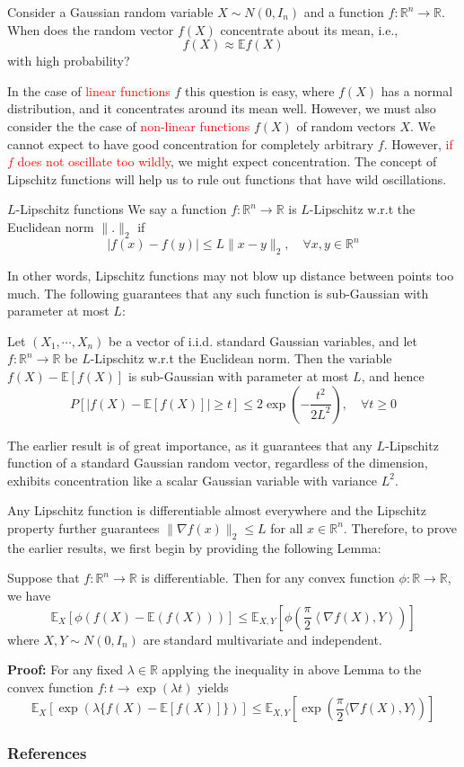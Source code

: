 \documentclass[10pt,handout,english]{beamer}
\newcommand{\E}{\mathbb{E}}
\newcommand{\R}{\mathbb{R}}
\newcommand{\1}{\mathbbm{1}}
\begin{document}
\begin{frame}[allowframebreaks]
Consider a Gaussian random variable $X\sim N(0,I_n)$ and a function $f:\R^n\to\R$. When does the random vector $f(X)$ concentrate about its mean, i.e.,
\[
f(X)\approx \E f(X)
\]
with high probability?

In the case of \textcolor{red}{linear functions} $f$ this question is easy, where $f(X)$ has a normal distribution, and it concentrates around its mean well. However, we must also consider the the case of \textcolor{red}{non-linear functions} $f(X)$ of random vectors $X$. We cannot expect to have good concentration for completely arbitrary $f$. However, \textcolor{red}{if $f$ does not oscillate too wildly}, we might expect concentration. The concept of Lipschitz functions will help us to rule out functions that have wild oscillations.
\begin{block}{$L$-Lipschitz functions}
We say a function $f:\R^n\to\R$ is $L$-Lipschitz w.r.t the Euclidean norm $\lVert.\rVert_2$ if
\[
\lvert f(x)-f(y)\rvert\leq L\lVert x-y\rVert_2,\quad\forall x,y\in\R^n
\]
\end{block}
In other words, Lipschitz functions may not blow up distance between points too much.
The following guarantees that any such function is sub-Gaussian with parameter at most $L$:
\begin{block}{}
Let $(X_1,\cdots,X_n)$ be a vector of i.i.d. standard Gaussian variables, and let $f:\R^n\to\R$ be $L$-Lipschitz w.r.t the Euclidean norm. Then the variable $f(X)-\E[f(X)]$ is sub-Gaussian with parameter at most $L$, and hence
\[
P[\lvert f(X)-\E[f(X)]\rvert\geq t]\leq 2\exp\left(-\frac{t^2}{2L^2}\right),\quad\forall t\geq0
\]
\end{block}

The earlier result is of great importance, as it guarantees that any $L$-Lipschitz function of a standard  Gaussian random vector, regardless of the dimension, exhibits concentration like a scalar Gaussian variable with variance $L^2$. 

Any Lipschitz function is differentiable almost everywhere and the Lipschitz property further guarantees $\lVert\nabla f(x)\rVert_2\leq L$ for all $x\in\R^n$. Therefore, to prove the earlier results, we first begin by providing the following Lemma:
\begin{lemma}
Suppose that $f:\R^n\to\R$ is differentiable. Then for any convex function $\phi:\R\to\R$, we have
\[
\E_X[\phi(f(X)-\E(f(X)))]\leq\E_{X,Y}\left[\phi\left(\frac{\pi}{2}\left\langle\nabla f(X),Y\right\rangle\right)\right]
\]
where $X,Y\sim N(0,I_n)$ are standard multivariate and independent.
\end{lemma}

\textbf{Proof:}
For any fixed $\lambda\in\R$ applying the inequality in above Lemma to the convex function $f: t\to \exp(\lambda t)$ yields
 \[
\E_{X}[\exp(\lambda\{f(X)- \E[f(X)]\})]\leq \E_{X,Y}\left[\exp\left(\frac{\pi}{2}\langle \nabla f(X),Y \rangle\right)\right]
\]

\end{frame}




\begin{frame}[allowframebreaks]
\frametitle{References}


\end{frame}
\end{document}
